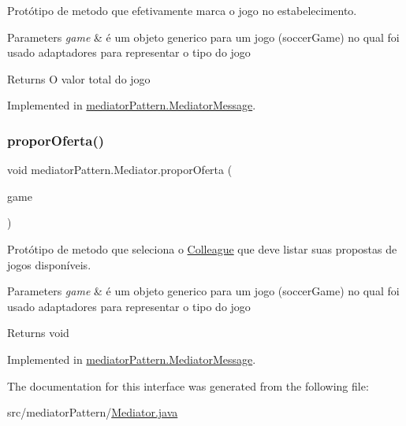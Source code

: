 Protótipo de metodo que efetivamente marca o jogo no estabelecimento. 


\begin{DoxyParams}{Parameters}
{\em game} & é um objeto generico para um jogo (soccer\+Game) no qual foi usado adaptadores para representar o tipo do jogo \\
\hline
\end{DoxyParams}
\begin{DoxyReturn}{Returns}
O valor total do jogo 
\end{DoxyReturn}


Implemented in \mbox{\hyperlink{classmediator_pattern_1_1_mediator_message_a59667d8a26b4ead1cc624acfb1dc1100}{mediator\+Pattern.\+Mediator\+Message}}.

\mbox{\label{interfacemediator_pattern_1_1_mediator_ad5219430e61d5602b1f8b7f6b8b35632}} 
\subsubsection{\texorpdfstring{proporOferta()}{proporOferta()}}
{\footnotesize\ttfamily void mediator\+Pattern.\+Mediator.\+propor\+Oferta (\begin{DoxyParamCaption}\item[{\mbox{\hyperlink{classtemplate_pattern_1_1soccer_game}{soccer\+Game}}}]{game }\end{DoxyParamCaption})}



Protótipo de metodo que seleciona o \mbox{\hyperlink{classmediator_pattern_1_1_colleague}{Colleague}} que deve listar suas propostas de jogos disponíveis. 


\begin{DoxyParams}{Parameters}
{\em game} & é um objeto generico para um jogo (soccer\+Game) no qual foi usado adaptadores para representar o tipo do jogo \\
\hline
\end{DoxyParams}
\begin{DoxyReturn}{Returns}
void 
\end{DoxyReturn}


Implemented in \mbox{\hyperlink{classmediator_pattern_1_1_mediator_message_a5371ff6847a4c3842737c89dbb891cbe}{mediator\+Pattern.\+Mediator\+Message}}.



The documentation for this interface was generated from the following file\+:\begin{DoxyCompactItemize}
\item 
src/mediator\+Pattern/\mbox{\hyperlink{_mediator_8java}{Mediator.\+java}}\end{DoxyCompactItemize}
